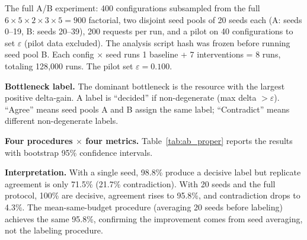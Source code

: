 \documentclass{ams-journal}
\begin{document}
The full A/B experiment: 400 configurations subsampled from the full $6 \times 5 \times 2 \times 3 \times 5 = 900$ factorial, two disjoint seed pools of 20 seeds each (A: seeds 0--19, B: seeds 20--39), 200 requests per run, and a pilot on 40 configurations to set $\varepsilon$ (pilot data excluded). The analysis script hash was frozen before running seed pool B. Each config $\times$ seed runs 1 baseline + 7 interventions = 8 runs, totaling 128{,}000 runs. The pilot set $\varepsilon = 0.100$.

\textbf{Bottleneck label.} The dominant bottleneck is the resource with the largest positive delta-gain. A label is ``decided'' if non-degenerate (max delta $> \varepsilon$). ``Agree'' means seed pools A and B assign the same label; ``Contradict'' means different non-degenerate labels.

\textbf{Four procedures $\times$ four metrics.} Table~\ref{tab:ab_proper} reports the results with bootstrap 95\% confidence intervals.

\begin{table}[htbp]
\centering
\caption{A/B experiment with actual bottleneck diagnosis: four procedures $\times$ four metrics, with bootstrap 95\% CI. 400 configurations, 2$\times$20 seeds, 200 requests, 8 runs per config per seed (128{,}000 total runs).}
\label{tab:ab_proper}
\setlength{\tabcolsep}{3pt}
\end{table}

\textbf{Interpretation.} With a single seed, 98.8\% produce a decisive label but replicate agreement is only 71.5\% (21.7\% contradiction). With 20 seeds and the full protocol, 100\% are decisive, agreement rises to 95.8\%, and contradiction drops to 4.3\%. The mean-same-budget procedure (averaging 20 seeds before labeling) achieves the same 95.8\%, confirming the improvement comes from seed averaging, not the labeling procedure.
\end{document}
